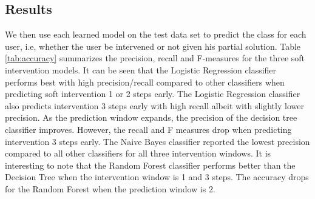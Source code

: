 \documentclass[doctor]{thesis} %
\theoremstyle{plain}
\begin{document}
\subsection*{Results}
We then use each learned model on the test data set to predict the class for each user, i.e, whether the user be intervened or not given his partial solution. Table \ref{tab:accuracy} summarizes the precision, recall and F-measures for the three soft intervention models.
It can be seen that the Logistic Regression classifier performs best with high precision/recall compared to other classifiers when predicting soft intervention 1 or 2 steps early. The Logistic Regression classifier also predicts intervention 3 steps early with high recall albeit with slightly lower precision. As the prediction window expands, the precision of the decision tree classifier improves. However, the recall and F measures drop when predicting intervention 3 steps early. The Naive Bayes classifier reported the lowest precision compared to all other classifiers for all three intervention windows. It is interesting to note that the Random Forest classifier performs better than the Decision Tree when the intervention window is 1 and 3 steps. The accuracy drops for the Random Forest when the prediction window is 2.
\end{document}
